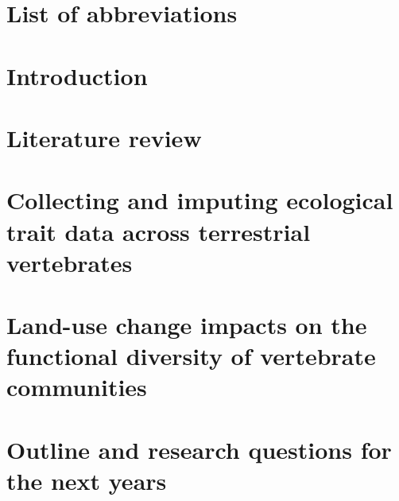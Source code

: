 \documentclass[11pt]{report}
\begin{document}






\clearpage
\tableofcontents


\clearpage
\listoftables

\clearpage
\listoffigures


\chapter*{List of abbreviations}


\clearpage

\chapter*{Introduction}


\chapter{Literature review}


\pagebreak
\chapter{Collecting and imputing ecological trait data across terrestrial vertebrates}


\chapter{Land-use change impacts on the functional diversity of vertebrate communities}

\chapter{Outline and research questions for the next years}
\end{document}
